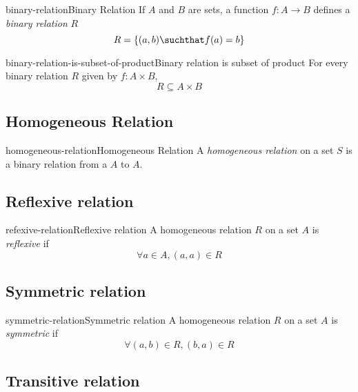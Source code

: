 \documentclass[preview]{standalone}
\begin{document}
\begin{snippetdefinition}{binary-relation}{Binary Relation}{
    If \(A\) and \(B\) are sets, a function \(f:A\to B\)
    defines a \textit{binary relation} \(R\)
    \[
        R = \{(a,b) \suchthat f(a)=b\}
    \]
}
\end{snippetdefinition}

\begin{snippetcorollary}{binary-relation-is-subset-of-product}{Binary relation is subset of product}{
    For every binary relation \(R\) given by \(f: A \times B\),
    \[R\subseteq A\times B\]
}
\end{snippetcorollary}

\subsection{Homogeneous Relation}

\begin{snippetdefinition}{homogeneous-relation}{Homogeneous Relation}{
    A \textit{homogeneous relation} on a set \(S\) is a binary relation
    from a \(A\) to \(A\).
}
\end{snippetdefinition}

\subsection{Reflexive relation}

\begin{snippetdefinition}{refexive-relation}{Reflexive relation}{
    A homogeneous relation \(R\) on a set \(A\) is \textit{reflexive}
    if
    \[
        \forall a\in A, (a,a) \in R
    \]
}
\end{snippetdefinition}

\subsection{Symmetric relation}

\begin{snippetdefinition}{symmetric-relation}{Symmetric relation}{
    A homogeneous relation \(R\) on a set \(A\) is \textit{symmetric}
    if
    \[
        \forall (a,b) \in R, (b,a) \in R
    \]
}
\end{snippetdefinition}

\subsection{Transitive relation}
\end{document}
